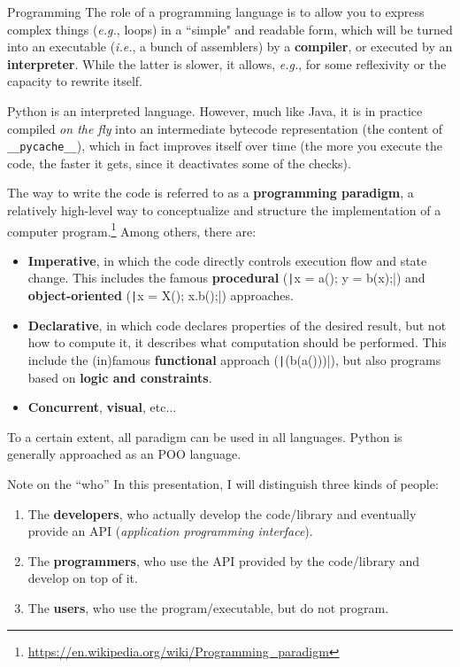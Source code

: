 \documentclass[10pt,
]{beamer}
\begin{document}
\begin{frame}{Programming}
	The role of a programming language is to allow you to express complex things (\textit{e.g.}, loops) in a ``simple" and readable form, which will be turned into an executable (\textit{i.e.}, a bunch of assemblers) by a \textbf{compiler}, or executed by an \textbf{interpreter}. While the latter is slower, it allows, \textit{e.g.}, for some reflexivity or the capacity to rewrite itself.
	
	Python is an interpreted language. However, much like Java, it is in practice compiled \textit{on the fly} into an intermediate bytecode representation (the content of \texttt{\_\_pycache\_\_}), which in fact improves itself over time (the more you execute the code, the faster it gets, since it deactivates some of the checks).
\end{frame}

\begin{frame}[fragile]
	The way to write the code is referred to as a \textbf{programming paradigm}, a relatively high-level way to conceptualize and structure the implementation of a computer program.\footnote{\url{https://en.wikipedia.org/wiki/Programming_paradigm}} Among others, there are:\begin{itemize}
		\item \textbf{Imperative}, in which the code directly controls execution flow and state change. This includes the famous \textbf{procedural} (\texttt|x = a(); y = b(x);|) and \textbf{object-oriented} (\texttt|x = X(); x.b();|) approaches.
		\item \textbf{Declarative}, in which code declares properties of the desired result, but not how to compute it, it describes what computation should be performed. This include the (in)famous \textbf{functional} approach (\texttt|(b(a()))|), but also programs based on \textbf{logic and constraints}.
		\item \textbf{Concurrent}, \textbf{visual}, etc...
	\end{itemize}
	
	To a certain extent, all paradigm can be used in all languages. Python is generally approached as an POO language.
	\vspace{1em}
\end{frame}

\begin{frame}{Note on the ``who''}
	In this presentation, I will distinguish three kinds of people:\begin{enumerate}
		\item The \textbf{developers}, who actually develop the code/library and eventually provide an API (\textit{application programming interface}).
		\item The \textbf{programmers}, who use the API provided by the code/library and develop on top of it.
		\item The \textbf{users}, who use the program/executable, but do not program.
	\end{enumerate}
\end{frame}
\end{document}
